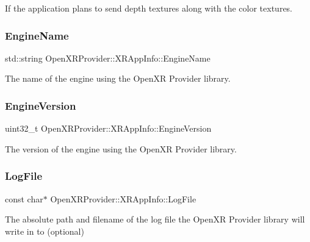If the application plans to send depth textures along with the color textures. 

\mbox{\label{struct_open_x_r_provider_1_1_x_r_app_info_af7200994789e0e1edd4acb80bd8742f1}} 
\subsubsection{\texorpdfstring{EngineName}{EngineName}}
{\footnotesize\ttfamily std\+::string Open\+X\+R\+Provider\+::\+X\+R\+App\+Info\+::\+Engine\+Name}



The name of the engine using the Open\+XR Provider library. 

\mbox{\label{struct_open_x_r_provider_1_1_x_r_app_info_a941d70698375c4ccdbffdaa0cef92122}} 
\subsubsection{\texorpdfstring{EngineVersion}{EngineVersion}}
{\footnotesize\ttfamily uint32\+\_\+t Open\+X\+R\+Provider\+::\+X\+R\+App\+Info\+::\+Engine\+Version}



The version of the engine using the Open\+XR Provider library. 

\mbox{\label{struct_open_x_r_provider_1_1_x_r_app_info_a134d71f0d127123dc1b4b1682102b0ee}} 
\subsubsection{\texorpdfstring{LogFile}{LogFile}}
{\footnotesize\ttfamily const char$\ast$ Open\+X\+R\+Provider\+::\+X\+R\+App\+Info\+::\+Log\+File}



The absolute path and filename of the log file the Open\+XR Provider library will write in to (optional) 

